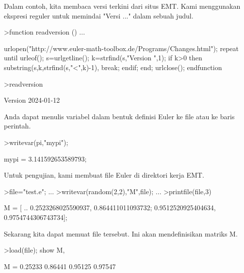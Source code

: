 \documentclass[a4paper,10pt]{article}
\begin{document}
\begin{eulernotebook}
\begin{eulercomment}
\begin{eulercomment}
\begin{eulercomment}
\begin{eulercomment}
\begin{eulercomment}
\begin{eulercomment}
\begin{eulercomment}
\begin{eulercomment}
\begin{eulercomment}
Dalam contoh, kita membaca versi terkini dari situs EMT. Kami
menggunakan ekspresi reguler untuk memindai "Versi ..." dalam sebuah
judul.
\end{eulercomment}
\begin{eulerprompt}
>function readversion () ...
\end{eulerprompt}
\begin{eulerudf}
  urlopen("http://www.euler-math-toolbox.de/Programs/Changes.html");
  repeat
    until urleof();
    s=urlgetline();
    k=strfind(s,"Version ",1);
    if k>0 then substring(s,k,strfind(s,"<",k)-1), break; endif;
  end;
  urlclose();
  endfunction
\end{eulerudf}
\begin{eulerprompt}
>readversion
\end{eulerprompt}
\begin{euleroutput}
  Version 2024-01-12
\end{euleroutput}
\begin{eulercomment}
Anda dapat menulis variabel dalam bentuk definisi Euler ke file atau
ke baris perintah.
\end{eulercomment}
\begin{eulerprompt}
>writevar(pi,"mypi");
\end{eulerprompt}
\begin{euleroutput}
  mypi = 3.141592653589793;
\end{euleroutput}
\begin{eulercomment}
Untuk pengujian, kami membuat file Euler di direktori kerja EMT.
\end{eulercomment}
\begin{eulerprompt}
>file="test.e"; ...
>writevar(random(2,2),"M",file); ...
>printfile(file,3)
\end{eulerprompt}
\begin{euleroutput}
  M = [ ..
  0.2523268025590937, 0.864411011093732;
  0.9512520925404634, 0.9754744306743734];
\end{euleroutput}
\begin{eulercomment}
Sekarang kita dapat memuat file tersebut. Ini akan mendefinisikan
matriks M.
\end{eulercomment}
\begin{eulerprompt}
>load(file); show M,
\end{eulerprompt}
\begin{euleroutput}
  M = 
    0.25233   0.86441 
    0.95125   0.97547 
\end{euleroutput}

\end{eulercomment}
\end{eulercomment}
\end{eulercomment}
\end{eulercomment}
\end{eulercomment}
\end{eulercomment}
\end{eulercomment}
\end{eulercomment}
\end{eulernotebook}
\end{document}
